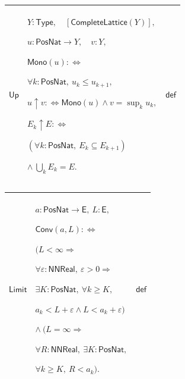 \documentclass[11pt]{amsart}
\newlength{\FTCThreeColumnBody}
\begin{document}
{\begin{tabular}{|@{}>{\centering\arraybackslash}m{0.251968\FTCThreeColumnBody}|>{\centering\arraybackslash}m{0.590551\FTCThreeColumnBody}|>{\centering\arraybackslash}m{0.157480\FTCThreeColumnBody}|}
\end{tabular}%
\par\setlength{\parskip}{0pt}\nointerlineskip
\noindent
\begin{tabular}{|@{}>{\centering\arraybackslash}m{0.251968\FTCThreeColumnBody}|>{\centering\arraybackslash}m{0.590551\FTCThreeColumnBody}|>{\centering\arraybackslash}m{0.157480\FTCThreeColumnBody}|}\hline
\hypertarget{def:Up}{$\displaystyle \textsf{Up}$} & $\displaystyle Y:\textsf{Type},\quad[\textsf{CompleteLattice}(Y)],$\par
$\displaystyle u:\textsf{PosNat}\to Y,\quad v:Y,$\par
$\displaystyle \textsf{Mono}(u):\Longleftrightarrow$\par
$\displaystyle \forall k:\textsf{PosNat},\ u_k\le u_{k+1},$\par
$\displaystyle u\uparrow v:\Longleftrightarrow\textsf{Mono}(u)\land v=\sup_k u_k,$\par
$\displaystyle E_k\uparrow E:\Longleftrightarrow$\par
$\displaystyle (\forall k:\textsf{PosNat},\ E_k\subseteq E_{k+1})$\par
$\displaystyle \land\ \bigcup_k E_k=E.$ & $\displaystyle \textsf{def}$\\ \hline
\end{tabular}%
\par\setlength{\parskip}{0pt}\nointerlineskip
\noindent
\begin{tabular}{|@{}>{\centering\arraybackslash}m{0.251968\FTCThreeColumnBody}|>{\centering\arraybackslash}m{0.590551\FTCThreeColumnBody}|>{\centering\arraybackslash}m{0.157480\FTCThreeColumnBody}|}\hline
\hypertarget{def:Limit}{$\displaystyle \textsf{Limit}$} & $\displaystyle a:\textsf{PosNat}\to\textsf{E},\ L:\textsf{E},$\par
$\displaystyle \textsf{Conv}(a,L):\Longleftrightarrow$\par
$\displaystyle \bigl(L<\infty\Rightarrow$\par
$\displaystyle \forall\varepsilon:\textsf{NNReal},\ \varepsilon>0\Rightarrow$\par
$\displaystyle \exists K:\textsf{PosNat},\ \forall k\ge K,$\par
$\displaystyle a_k<L+\varepsilon\land L<a_k+\varepsilon\bigr)$\par
$\displaystyle \land\ \bigl(L=\infty\Rightarrow$\par
$\displaystyle \forall R:\textsf{NNReal},\ \exists K:\textsf{PosNat},$\par
$\displaystyle \forall k\ge K,\ R<a_k\bigr).$ & $\displaystyle \textsf{def}$\\ \hline

\end{tabular}}
\end{document}
